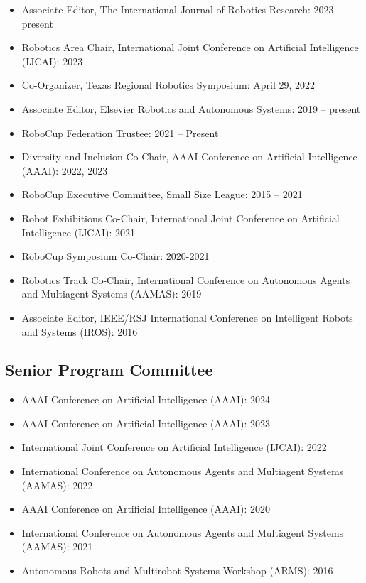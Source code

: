 \documentclass[Times]{article}
\begin{document}
\begin{itemize}
  \item Associate Editor, The International Journal of Robotics Research: 2023 -- present
  \item Robotics Area Chair, International Joint Conference on Artificial Intelligence (IJCAI): 2023
  \item Co-Organizer, Texas Regional Robotics Symposium: April 29, 2022
  \item Associate Editor, Elsevier Robotics and Autonomous Systems: 2019 -- present
  \item RoboCup Federation Trustee: 2021 -- Present
  \item Diversity and Inclusion Co-Chair, AAAI Conference on Artificial
  Intelligence (AAAI): 2022, 2023
  \item RoboCup Executive Committee, Small Size League: 2015 -- 2021
  \item Robot Exhibitions Co-Chair, International Joint Conference on Artificial Intelligence (IJCAI): 2021
  \item RoboCup Symposium Co-Chair: 2020-2021
\item Robotics Track Co-Chair, International Conference on Autonomous Agents and
Multiagent Systems (AAMAS): 2019
  \item Associate Editor, IEEE/RSJ International Conference on Intelligent
Robots and Systems (IROS): 2016
\end{itemize}

\subsection*{Senior Program Committee}
\begin{itemize}
  \item AAAI Conference on Artificial Intelligence (AAAI): 2024
  \item AAAI Conference on Artificial Intelligence (AAAI): 2023
  \item International Joint Conference on Artificial Intelligence (IJCAI): 2022
  \item International Conference on Autonomous Agents and Multiagent Systems
  (AAMAS): 2022
  \item AAAI Conference on Artificial Intelligence (AAAI): 2020
  \item International Conference on Autonomous Agents and Multiagent Systems
  (AAMAS): 2021
  \item Autonomous Robots and Multirobot Systems Workshop (ARMS): 2016
\end{itemize}
\end{document}
